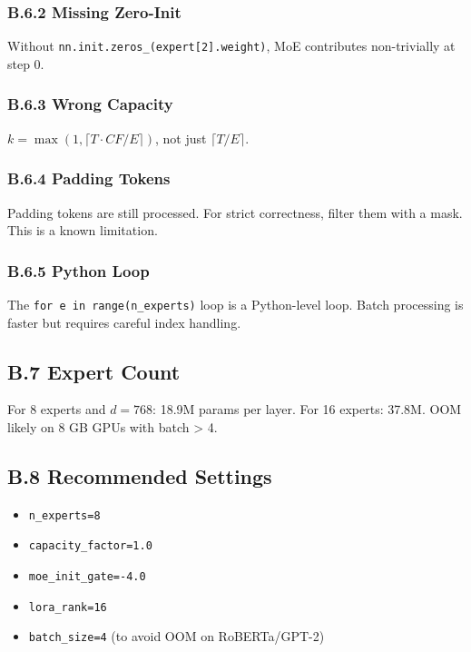 \subsubsection{B.6.2 Missing Zero-Init}

Without \texttt{nn.init.zeros\_(expert[2].weight)}, MoE contributes non-trivially 
at step 0.

\subsubsection{B.6.3 Wrong Capacity}

$k = \max(1, \lceil T \cdot CF / E \rceil)$, not just $\lceil T/E \rceil$.

\subsubsection{B.6.4 Padding Tokens}

Padding tokens are still processed. For strict correctness, filter them 
with a mask. This is a known limitation.

\subsubsection{B.6.5 Python Loop}

The \texttt{for e in range(n\_experts)} loop is a Python-level loop. Batch 
processing is faster but requires careful index handling.

\subsection{B.7 Expert Count}

For 8 experts and $d = 768$: 18.9M params per layer. For 16 experts: 
37.8M. OOM likely on 8 GB GPUs with batch \textgreater{} 4.

\subsection{B.8 Recommended Settings}

\begin{itemize}
\item \texttt{n\_experts=8}
\item \texttt{capacity\_factor=1.0}
\item \texttt{moe\_init\_gate=-4.0}
\item \texttt{lora\_rank=16}
\item \texttt{batch\_size=4} (to avoid OOM on RoBERTa/GPT-2)

\end{itemize}


